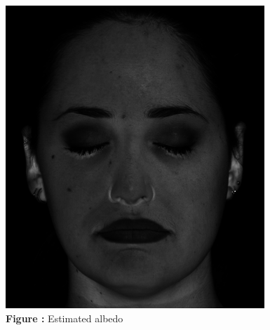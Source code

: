 \documentclass{article}
\begin{document}
	\begin{minipage}{0.48\linewidth}
	\centering
	\includegraphics[width=\linewidth]{./src/1f-a.png}
	 \\ %
	\textbf{Figure \thefigure:} Estimated albedo  %
	\label{fig:Q1_fa}         %
	\end{minipage}
\hfill
\end{document}
